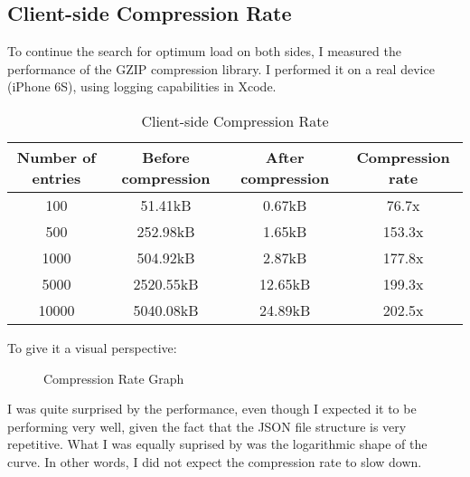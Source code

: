 \newpage

\subsection{Client-side Compression Rate}

To continue the search for optimum load on both sides, I measured the performance of the GZIP compression library. I performed it on a real device (iPhone 6S), using logging capabilities in Xcode. 

\begin{table}[!ht]
\begin{center}
\begin{tabular}{|c|c|c|c|}
\hline
\textbf{Number of entries} & \textbf{Before compression} & \textbf{After compression} & \textbf{Compression rate} \\
\hline
100 & 51.41kB & 0.67kB & 76.7x \\
\hline
500 & 252.98kB & 1.65kB & 153.3x \\
\hline
1000 & 504.92kB & 2.87kB & 177.8x \\
\hline
5000 & 2520.55kB & 12.65kB & 199.3x \\
\hline
10000 & 5040.08kB & 24.89kB & 202.5x \\
\hline
\end{tabular}
\end{center}
\caption{Client-side Compression Rate}
\label{tab:compression}
\end{table}

To give it a visual perspective:

\begin{figure}[!ht]
\begin{center}
\end{center}
\caption{Compression Rate Graph}
\end{figure}

I was quite surprised by the performance, even though I expected it to be performing very well, given the fact that the JSON file structure is very repetitive. What I was equally suprised by was the logarithmic shape of the curve. In other words, I did not expect the compression rate to slow down.

